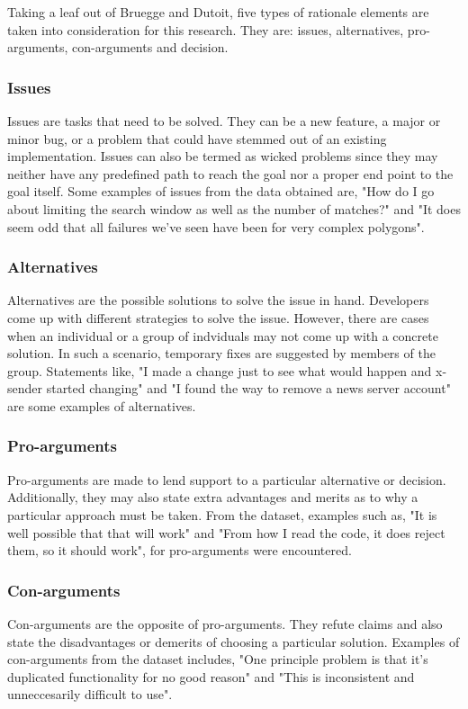 \documentclass[a4paper,12pt,twoside]{report}
\begin{document}
Taking a leaf out of Bruegge and Dutoit, five types of rationale elements are taken into consideration for this research. They are: issues, alternatives, pro-arguments, con-arguments and decision.
 
\subsubsection{Issues}
Issues are tasks that need to be solved. They can be a new feature, a major or minor bug, or a problem that could have stemmed out of an existing implementation. Issues can also be termed as wicked problems since they may neither have any predefined path to reach the goal nor a proper end point to the goal itself. Some examples of issues from the data obtained are, "How do I go about limiting the search window as well as the number of matches?" and "It does seem odd that all failures we've seen have been for very complex polygons".  

\subsubsection{Alternatives}
Alternatives are the possible solutions to solve the issue in hand. Developers come up with different strategies to solve the issue. However, there are cases when an individual or a group of indviduals may not come up with a concrete solution. In such a scenario, temporary fixes are suggested by members of the group. Statements like, "I made a change just to see what would happen and x-sender started changing" and "I found the way to remove a news server account" are some examples of alternatives. 

\subsubsection{Pro-arguments}
Pro-arguments are made to lend support to a particular alternative or decision. Additionally, they may also state extra advantages and merits as to why a particular approach must be taken. From the dataset, examples such as, "It is well possible that that will work" and "From how I read the code, it does reject them, so it should work", for pro-arguments were encountered. 

\subsubsection{Con-arguments}
Con-arguments are the opposite of pro-arguments. They refute claims and also state the disadvantages or demerits of choosing a particular solution. Examples of con-arguments from the dataset includes, "One principle problem is that it's duplicated functionality for no good reason" and "This is inconsistent and unneccesarily difficult to use".
\end{document}
